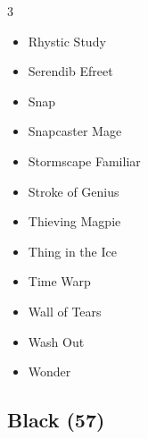 \documentclass[11pt]{article}
\begin{document}
\begin{multicols}{3}
\begin{itemize}[leftmargin=1em,itemsep=0pt,parsep=0pt]
\item Rhystic Study
\item Serendib Efreet
\item Snap
\item Snapcaster Mage
\item Stormscape Familiar
\item Stroke of Genius
\item Thieving Magpie
\item Thing in the Ice
\item Time Warp
\item Wall of Tears
\item Wash Out
\item Wonder
\end{itemize}
\end{multicols}

\subsection*{Black (57)}
\end{document}
